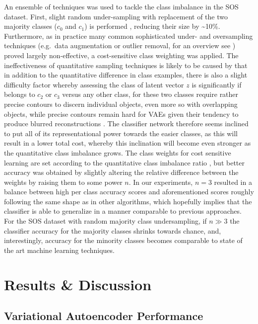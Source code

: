 \documentclass[twocolumn]{article}
\begin{document}
\noindent An ensemble of techniques was used to tackle the class imbalance in the
SOS dataset. First, slight random under-sampling with replacement of the
two majority classes (\(c_0\) and \(c_1\)) is performed
\citep[see][]{JMLR:v18:16-365}, reducing their size by
\textasciitilde{}10\%. Furthermore, as in practice many common
sophisticated under- and oversampling techniques (e.g.~data augmentation
or outlier removal, for an overview see \citet{fernandez2013}) proved
largely non-effective, a cost-sensitive class weighting was applied. The
ineffectiveness of quantitative sampling techniques is likely to be caused
by that in addition to the quantitative difference in class examples,
there is also a slight difficulty factor whereby assessing the class of
latent vector \(z\) is significantly if belongs to \(c_2\) or \(c_3\)
versus any other class, for these two classes require rather precise
contours to discern individual objects, even more so with overlapping
objects, while precise contours remain hard for VAEs given their
tendency to produce blurred reconstructions
\citep{larsen2015autoencoding}. The classifier network therefore seems
inclined to put all of its representational power towards the easier
classes, as this will result in a lower total cost, whereby this
inclination will become even stronger as the quantitative class
imbalance grows. The class weights for cost sensitive learning are set
according to the quantitative class imbalance ratio \citep[similar to
section 3.2 in][]{fernandez2013}, but better accuracy was obtained by
slightly altering the relative difference between the weights by raising
them to some power \(n\). In our experiments, \(n=3\) resulted in a
balance between high per class accuracy scores and aforementioned scores
roughly following the same shape as in other algorithms, which hopefully
implies that the classifier is able to generalize in a manner comparable
to previous approaches. For the SOS dataset with random majority class
undersampling, if \(n \gg 3\) the classifier accuracy for the majority
classes shrinks towards chance, and, interestingly, accuracy for the
minority classes becomes comparable to state of the art machine
learning techniques.


\hypertarget{results-discussion}{%
\section{Results \& Discussion}\label{results-discussion}}

\hypertarget{variational-autoencoder-performance}{%
\subsection{Variational Autoencoder
Performance}\label{variational-autoencoder-performance}}
\end{document}
